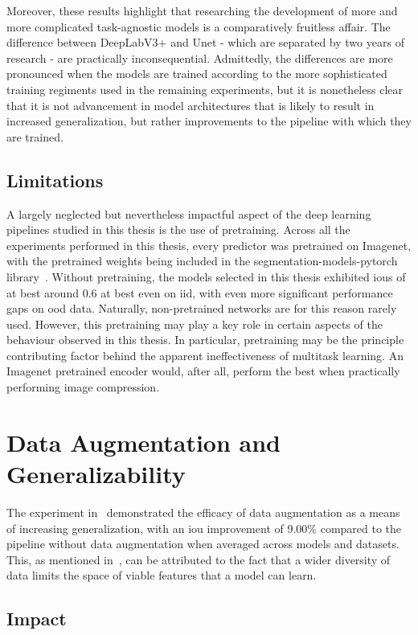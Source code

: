Moreover, these results highlight that researching the development of more and more complicated task-agnostic models is a comparatively fruitless affair. The difference between DeepLabV3+ and Unet - which are separated by two years of research - are practically inconsequential. Admittedly, the differences are more pronounced when the models are trained according to the more sophisticated training regiments used in the remaining experiments, but it is nonetheless clear that it is not advancement in model architectures that is likely to result in increased generalization, but rather improvements to the pipeline with which they are trained.

\subsection{Limitations}\label{pretraining}
        A largely neglected but nevertheless impactful aspect of the deep learning pipelines studied in this thesis is the use of pretraining. Across all the experiments performed in this thesis, every predictor was pretrained on Imagenet, with the pretrained weights being included in the segmentation-models-pytorch library~\cite{smp}. Without pretraining, the models selected in this thesis exhibited \glspl{iou} of at best around 0.6 at best even on \gls{iid}, with even more significant performance gaps on \gls{ood} data. Naturally, non-pretrained networks are for this reason rarely used. However, this pretraining may play a key role in certain aspects of the behaviour observed in this thesis. In particular, pretraining may be the principle contributing factor behind the apparent ineffectiveness of multitask learning. An Imagenet pretrained encoder would, after all, perform the best when practically performing image compression.

\section{Data Augmentation and Generalizability}
The experiment in~ demonstrated the efficacy of data augmentation as a means of increasing generalization, with an \gls{iou} improvement of 9.00\% compared to the pipeline without data augmentation when averaged across models and datasets. This, as mentioned in~, can be attributed to the fact that a wider diversity of data limits the space of viable features that a model can learn. 

\subsection{Impact}

